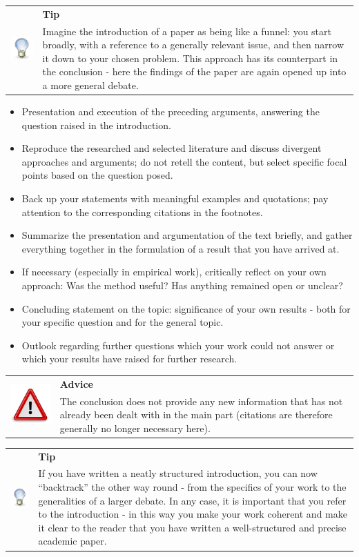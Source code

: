 \documentclass[
  english,
]{scrreprt}
\newlength{\iconwidth}
\newenvironment{displaybox}[2]{%
    \begin{center}
        \setlength\arrayrulewidth{0.75pt}%
        \arrayrulecolor{white}%
        \renewcommand{\arraystretch}{1.3}%
        \begin{tabular}{p{\iconwidth}p{\linewidth-4\tabcolsep-\iconwidth}}
            \multirow{2}{*}{#2}&\cellcolor{boxheadcol}\textbf{\sffamily\color{white}#1} \\%
            \hhline{~-}%
            &\cellcolor{boxcol}%
}{%
            \\
        \end{tabular}
        \arrayrulecolor{black}
    \end{center}
}
\newenvironment{Tip}{%
\begin{displaybox}{Tip}{\includegraphics[width=\iconwidth]{images/icon-tipp}}}%
{\end{displaybox}}
\newenvironment{Advice}{%
\begin{displaybox}{Advice}{\includegraphics[width=\iconwidth]{images/icon-hinweis}}}%
{\end{displaybox}}
\begin{document}
\begin{Tip}

Imagine the introduction of a paper as being like a funnel: you start broadly, with a reference to a generally relevant issue, and then narrow it down to your chosen problem. This approach has its counterpart in the conclusion - here the findings of the paper are again opened up into a more general debate.

\end{Tip}

\begin{itemize}
\item
  Presentation and execution of the preceding arguments, answering the question raised in the introduction.
\item
  Reproduce the researched and selected literature and discuss divergent approaches and arguments; do not retell the content, but select specific focal points based on the question posed.
\item
  Back up your statements with meaningful examples and quotations; pay attention to the corresponding citations in the footnotes.
\end{itemize}

\begin{itemize}
\item
  Summarize the presentation and argumentation of the text briefly, and gather everything together in the formulation of a result that you have arrived at.
\item
  If necessary (especially in empirical work), critically reflect on your own approach: Was the method useful? Has anything remained open or unclear?
\item
  Concluding statement on the topic: significance of your own results - both for your specific question and for the general topic.
\item
  Outlook regarding further questions which your work could not answer or which your results have raised for further research.
\end{itemize}

\begin{Advice}

The conclusion does not provide any new information that has not already been dealt with in the main part (citations are therefore generally no longer necessary here).

\end{Advice}

\begin{Tip}

If you have written a neatly structured introduction, you can now “backtrack” the other way round - from the specifics of your work to the generalities of a larger debate. In any case, it is important that you refer to the introduction - in this way you make your work coherent and make it clear to the reader that you have written a well-structured and precise academic paper.

\end{Tip}
\end{document}
